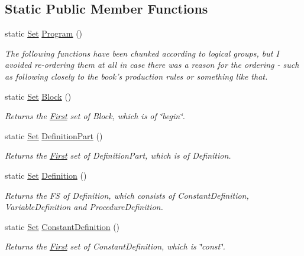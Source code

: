 \subsection*{Static Public Member Functions}
\begin{DoxyCompactItemize}
\item 
static \hyperlink{classSet}{Set} \hyperlink{classFirst_a5d7cc34fb31a5d9b862fd2dcfc7613b5}{Program} ()
\begin{DoxyCompactList}\small\item\em The following functions have been chunked according to logical groups, but I avoided re-\/ordering them at all in case there was a reason for the ordering -\/ such as following closely to the book's production rules or something like that. \item\end{DoxyCompactList}\item 
static \hyperlink{classSet}{Set} \hyperlink{classFirst_aedc44f52b44e7b409df77f585d5c0a94}{Block} ()
\begin{DoxyCompactList}\small\item\em Returns the \hyperlink{classFirst}{First} set of Block, which is of \char`\"{}begin\char`\"{}. \item\end{DoxyCompactList}\item 
static \hyperlink{classSet}{Set} \hyperlink{classFirst_aedd571350accc9639500cbded4a5b183}{DefinitionPart} ()
\begin{DoxyCompactList}\small\item\em Returns the \hyperlink{classFirst}{First} set of DefinitionPart, which is of Definition. \item\end{DoxyCompactList}\item 
static \hyperlink{classSet}{Set} \hyperlink{classFirst_a68b6b0e9e971cbd2acf56a625ebe0599}{Definition} ()
\begin{DoxyCompactList}\small\item\em Returns the FS of Definition, which consists of ConstantDefinition, VariableDefinition and ProcedureDefinition. \item\end{DoxyCompactList}\item 
static \hyperlink{classSet}{Set} \hyperlink{classFirst_a67220fb2ed992341a3769a7251366674}{ConstantDefinition} ()
\begin{DoxyCompactList}\small\item\em Returns the \hyperlink{classFirst}{First} set of ConstantDefinition, which is \char`\"{}const\char`\"{}. \item\end{DoxyCompactList}\item 

\end{DoxyCompactItemize}
